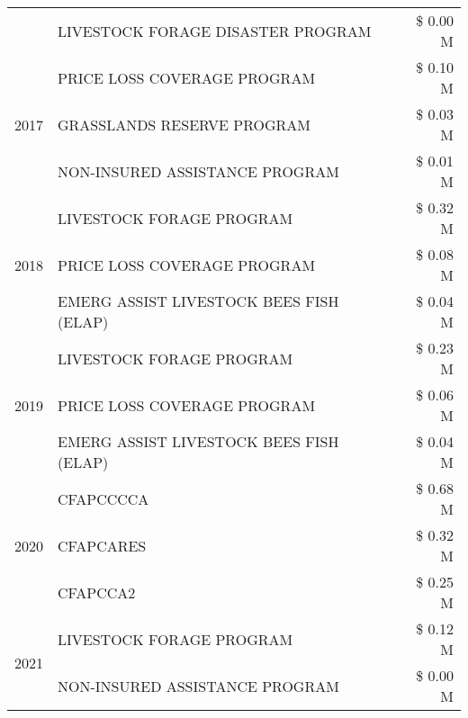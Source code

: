\begin{tabular}{llr}
 & LIVESTOCK FORAGE DISASTER PROGRAM & \$ 0.00 M \\
\cline{1-3}
\multirow[t]{3}{*}{2017} & PRICE LOSS COVERAGE PROGRAM & \$ 0.10 M \\
 & GRASSLANDS RESERVE PROGRAM & \$ 0.03 M \\
 & NON-INSURED ASSISTANCE PROGRAM & \$ 0.01 M \\
\cline{1-3}
\multirow[t]{3}{*}{2018} & LIVESTOCK FORAGE PROGRAM & \$ 0.32 M \\
 & PRICE LOSS COVERAGE PROGRAM & \$ 0.08 M \\
 & EMERG ASSIST LIVESTOCK BEES FISH (ELAP) & \$ 0.04 M \\
\cline{1-3}
\multirow[t]{3}{*}{2019} & LIVESTOCK FORAGE PROGRAM & \$ 0.23 M \\
 & PRICE LOSS COVERAGE PROGRAM & \$ 0.06 M \\
 & EMERG ASSIST LIVESTOCK BEES FISH (ELAP) & \$ 0.04 M \\
\cline{1-3}
\multirow[t]{3}{*}{2020} & CFAPCCCCA & \$ 0.68 M \\
 & CFAPCARES & \$ 0.32 M \\
 & CFAPCCA2 & \$ 0.25 M \\
\cline{1-3}
\multirow[t]{2}{*}{2021} & LIVESTOCK FORAGE PROGRAM & \$ 0.12 M \\
 & NON-INSURED ASSISTANCE PROGRAM & \$ 0.00 M \\
\cline{1-3}
\bottomrule
\end{tabular}
